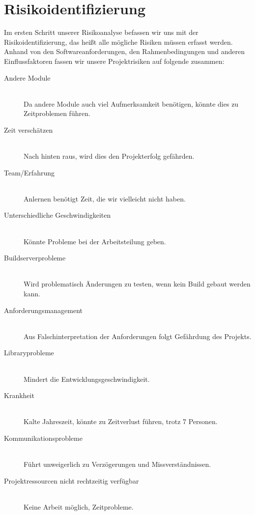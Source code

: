 \section{Risikoidentifizierung}
Im ersten Schritt unserer Risikoanalyse befassen wir uns mit der Risikoidentifizierung, das heißt alle mögliche Risiken müssen erfasst werden. Anhand von den Softwareanforderungen, den Rahmenbedingungen und anderen Einflussfaktoren fassen wir unsere Projektrisiken auf folgende zusammen:

\vspace{2em}

\begin{description}
	\item [Andere Module]\ \\Da andere Module auch viel Aufmerksamkeit benötigen, könnte dies zu Zeitproblemen führen.
	\item [Zeit verschätzen]\ \\Nach hinten raus, wird dies den Projekterfolg gefährden.
	\item [Team/Erfahrung]\ \\Anlernen benötigt Zeit, die wir vielleicht nicht haben.
	\item [Unterschiedliche Geschwindigkeiten]\ \\Könnte Probleme bei der Arbeitsteilung geben.
	\item [Buildserverprobleme]\ \\Wird problematisch Änderungen zu testen, wenn kein Build gebaut werden kann.
	\item [Anforderungsmanagement]\ \\Aus Falschinterpretation der Anforderungen folgt Gefährdung des Projekts.
	\item [Libraryprobleme]\ \\Mindert die Entwicklungsgeschwindigkeit.
	\item [Krankheit]\ \\Kalte Jahreszeit, könnte zu Zeitverlust führen, trotz 7 Personen.
	\item [Kommunikationsprobleme]\ \\Führt unweigerlich zu Verzögerungen und Missverständnissen.
	\item [Projektressourcen nicht rechtzeitig verfügbar]\ \\Keine Arbeit möglich, Zeitprobleme.
\end{description}

\pagebreak